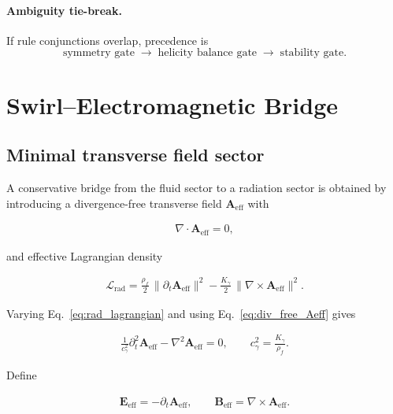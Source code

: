 \documentclass[11pt]{article}
\theoremstyle{definition}
\theoremstyle{plain}
\theoremstyle{remark}
\newcommand{\rhoF}{{\rho_{\!f}}}
\begin{document}
    \paragraph{Ambiguity tie-break.}
        If rule conjunctions overlap, precedence is
        \[
            \text{symmetry gate} \;\to\; \text{helicity balance gate} \;\to\; \text{stability gate}.
        \]

\section{Swirl--Electromagnetic Bridge}
    \label{sec:embridge}

    \subsection{Minimal transverse field sector}

        A conservative bridge from the fluid sector to a radiation sector is obtained by introducing a divergence-free transverse field $\mathbf{A}_{\mathrm{eff}}$ with

        \begin{align}
            \nabla\cdot \mathbf{A}_{\mathrm{eff}} = 0,
            \label{eq:div_free_Aeff}
        \end{align}

        and effective Lagrangian density

        \begin{align}
            \mathcal{L}_{\mathrm{rad}}
            =
            \frac{\rhoF}{2}\,\lVert \partial_t \mathbf{A}_{\mathrm{eff}}\rVert^2
            -
            \frac{K_\gamma}{2}\,\lVert \nabla\times\mathbf{A}_{\mathrm{eff}}\rVert^2.
            \label{eq:rad_lagrangian}
        \end{align}

        Varying Eq.~\eqref{eq:rad_lagrangian} and using Eq.~\eqref{eq:div_free_Aeff} gives

        \begin{align}
            \frac{1}{c_\gamma^2}\partial_t^2 \mathbf{A}_{\mathrm{eff}} - \nabla^2 \mathbf{A}_{\mathrm{eff}} = 0,
            \qquad
            c_\gamma^2 = \frac{K_\gamma}{\rhoF}.
            \label{eq:vector_wave_Aeff}
        \end{align}

        Define

        \begin{align}
            \mathbf{E}_{\mathrm{eff}} = -\partial_t \mathbf{A}_{\mathrm{eff}},
            \qquad
            \mathbf{B}_{\mathrm{eff}} = \nabla\times \mathbf{A}_{\mathrm{eff}}.
            \label{eq:effective_em_fields}
        \end{align}
\end{document}
